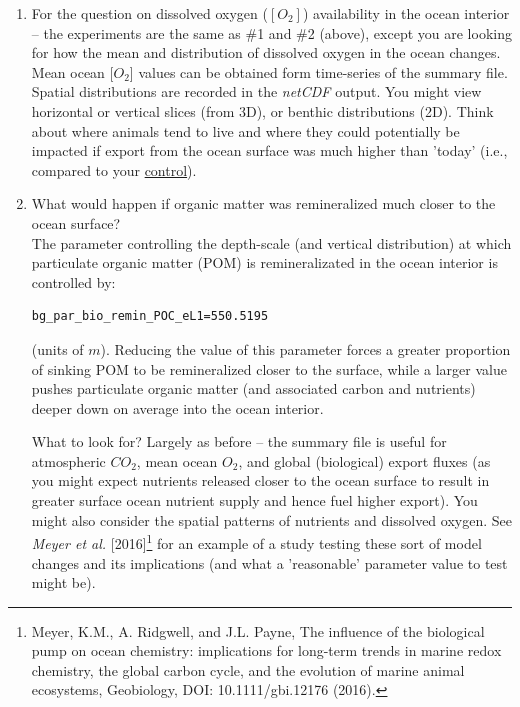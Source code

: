 \begin{enumerate}[noitemsep]
\vspace{1mm}
\item For the question on dissolved oxygen (\([O_{2}]\)) availability in the ocean interior -- the experiments are the same as \#1 and \#2 (above), except you are looking for how the mean and distribution of dissolved oxygen in the ocean changes. Mean ocean [\(O_{2}\)] values can be obtained form time-series of the summary file. Spatial distributions are recorded in the \textit{netCDF} output. You might view horizontal or vertical slices (from 3D), or benthic distributions (2D). Think about where animals tend to live and where they could potentially be impacted if export from the ocean surface was much higher than 'today' (i.e., compared to your \uline{control}).

\vspace{1mm}
\item What would happen if organic matter was remineralized much closer to the ocean surface?
\\The parameter controlling the depth-scale (and vertical distribution) at which particulate organic matter (POM) is remineralizated in the ocean interior is controlled by:
\vspace{-1pt}\small\begin{verbatim}
bg_par_bio_remin_POC_eL1=550.5195
\end{verbatim}\normalsize\vspace{-1pt}
(units of \(m\)). Reducing the value of this parameter forces a greater proportion of sinking POM to be remineralized closer to the surface, while a larger value pushes particulate organic matter  (and associated carbon and nutrients) deeper down on average into the ocean interior.

\vspace{1mm}
\noindent What to look for? Largely as before -- the summary file is useful for atmospheric \(CO_{2}\), mean ocean {\(O_{2}\)}, and global (biological) export fluxes (as you might expect nutrients released closer to the ocean surface to result in greater surface ocean nutrient supply and hence fuel higher export). You might also consider the spatial patterns of nutrients and dissolved oxygen. See \textit{Meyer et al.} [2016]\footnote{Meyer, K.M., A. Ridgwell, and J.L. Payne, The influence of the biological pump on ocean chemistry: implications for long-term trends in marine redox chemistry, the global carbon cycle, and the evolution of marine animal ecosystems, Geobiology, DOI: 10.1111/gbi.12176 (2016).} for an example of a study testing these sort of model changes and its implications (and what a 'reasonable' parameter value to test might be).


\end{enumerate}

